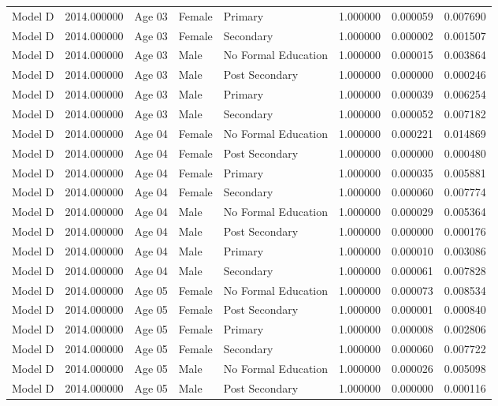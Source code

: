 \begin{table}[ht]
\begin{tabular}{lrlllrrr}
Model D & 2014.000000 & Age 03 & Female & Primary & 1.000000 & 0.000059 & 0.007690 \\
Model D & 2014.000000 & Age 03 & Female & Secondary & 1.000000 & 0.000002 & 0.001507 \\
Model D & 2014.000000 & Age 03 & Male & No Formal Education & 1.000000 & 0.000015 & 0.003864 \\
Model D & 2014.000000 & Age 03 & Male & Post Secondary & 1.000000 & 0.000000 & 0.000246 \\
Model D & 2014.000000 & Age 03 & Male & Primary & 1.000000 & 0.000039 & 0.006254 \\
Model D & 2014.000000 & Age 03 & Male & Secondary & 1.000000 & 0.000052 & 0.007182 \\
Model D & 2014.000000 & Age 04 & Female & No Formal Education & 1.000000 & 0.000221 & 0.014869 \\
Model D & 2014.000000 & Age 04 & Female & Post Secondary & 1.000000 & 0.000000 & 0.000480 \\
Model D & 2014.000000 & Age 04 & Female & Primary & 1.000000 & 0.000035 & 0.005881 \\
Model D & 2014.000000 & Age 04 & Female & Secondary & 1.000000 & 0.000060 & 0.007774 \\
Model D & 2014.000000 & Age 04 & Male & No Formal Education & 1.000000 & 0.000029 & 0.005364 \\
Model D & 2014.000000 & Age 04 & Male & Post Secondary & 1.000000 & 0.000000 & 0.000176 \\
Model D & 2014.000000 & Age 04 & Male & Primary & 1.000000 & 0.000010 & 0.003086 \\
Model D & 2014.000000 & Age 04 & Male & Secondary & 1.000000 & 0.000061 & 0.007828 \\
Model D & 2014.000000 & Age 05 & Female & No Formal Education & 1.000000 & 0.000073 & 0.008534 \\
Model D & 2014.000000 & Age 05 & Female & Post Secondary & 1.000000 & 0.000001 & 0.000840 \\
Model D & 2014.000000 & Age 05 & Female & Primary & 1.000000 & 0.000008 & 0.002806 \\
Model D & 2014.000000 & Age 05 & Female & Secondary & 1.000000 & 0.000060 & 0.007722 \\
Model D & 2014.000000 & Age 05 & Male & No Formal Education & 1.000000 & 0.000026 & 0.005098 \\
Model D & 2014.000000 & Age 05 & Male & Post Secondary & 1.000000 & 0.000000 & 0.000116 \\

\end{tabular}
\end{table}
